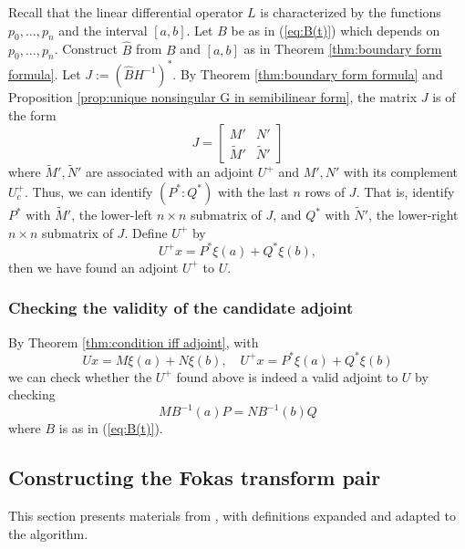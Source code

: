 \documentclass[12pt, oneside, a4paper]{article}
\begin{document}
Recall that the linear differential operator $L$ is characterized by the functions $p_0,\ldots,p_n$ and the interval $[a,b]$. Let $B$ be as in (\ref{eq:B(t)}) which depends on $p_0,\ldots,p_n$. Construct $\hat{B}$ from $B$ and $[a,b]$ as in Theorem \ref{thm:boundary form formula}. Let $J:=(\hat{B}H^{-1})^*$. By Theorem \ref{thm:boundary form formula} and Proposition \ref{prop:unique nonsingular G in semibilinear form}, the matrix $J$ is of the form
\[J=\begin{bmatrix}M' & N'\\ \tilde{M}' & \tilde{N}'\end{bmatrix}\]
where $\tilde{M}', \tilde{N}'$ are associated with an adjoint $U^+$ and $M', N'$ with its complement $U_c^+$.
Thus, we can identify $(P^*:Q^*)$ with the last $n$ rows of $J$. That is, identify $P^*$ with $\tilde{M}'$, the lower-left $n\times n$ submatrix of $J$, and $Q^*$ with $\tilde{N}'$, the lower-right $n\times n$ submatrix of $J$. Define $U^+$ by
\[U^+x = P^* \xi(a) + Q^* \xi(b),\]
then we have found an adjoint $U^+$ to $U$.

\subsubsection{Checking the validity of the candidate adjoint}
By Theorem \ref{thm:condition iff adjoint}, with
\begin{equation}\label{eq:adjointU}
    Ux = M\xi(a) + N\xi(b),\quad U^+x = P^* \xi(a) + Q^* \xi(b)
\end{equation}
we can check whether the $U^+$ found above is indeed a valid adjoint to $U$ by checking 
\[MB^{-1}(a)P = NB^{-1}(b)Q\]
where $B$ is as in (\ref{eq:B(t)}).

\subsection{Constructing the Fokas transform pair}\label{sec:fokas_transform_pair}

This section presents materials from \cite{Smith2016}, with definitions expanded and adapted to the algorithm.
\end{document}
